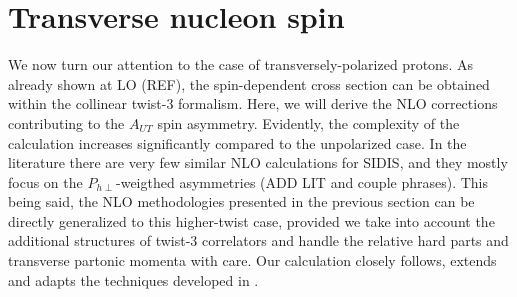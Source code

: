 \section{Transverse nucleon spin}
We now turn our attention to the case of transversely-polarized protons. As already shown at LO (REF), the spin-dependent cross section can be obtained within the collinear twist-3 formalism. Here, we will derive the NLO corrections contributing to the $A_{UT}$ spin asymmetry. Evidently, the complexity of the calculation increases significantly compared to the unpolarized case. In the literature there are very few similar NLO calculations for SIDIS, and they mostly focus on the $P_{h\perp}$-weigthed asymmetries (ADD LIT and couple phrases). This being said, the NLO methodologies presented in the previous section can be directly generalized to this higher-twist case, provided we take into account the additional structures of twist-3 correlators and handle the relative hard parts and transverse partonic momenta with care. Our calculation closely follows, extends and adapts the techniques developed in \cite{rein2025, Gamberg_2019, kanazawa_contribution_2013, koike_transverse_2022}. 

